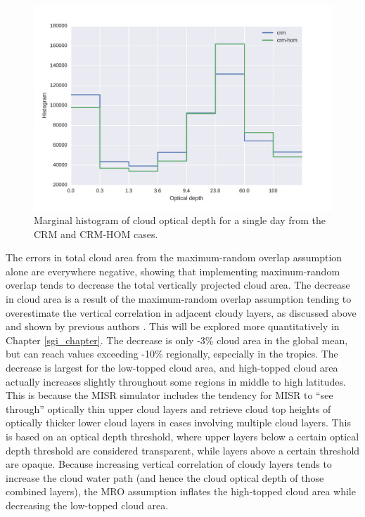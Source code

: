 \begin{figure}
\centering
\includegraphics[width=\columnwidth]{graphics/taudist_hom.pdf}
\caption{Marginal histogram of cloud optical depth for a single day from the CRM and CRM-HOM cases.}
\label{sg_cldtau_distribution}
\end{figure}

The errors in total cloud area from the maximum-random overlap assumption alone are everywhere negative, showing that implementing maximum-random overlap tends to decrease the total vertically projected cloud area. The decrease in cloud area is a result of the maximum-random overlap assumption tending to overestimate the vertical correlation in adjacent cloudy layers, as discussed above and shown by previous authors \citep{mace_and_benson-troth_2002, hogan_and_illingworth_2000, barker_2008}. This will be explored more quantitatively in Chapter \ref{sgi_chapter}. The decrease is only -3\% cloud area in the global mean, but can reach values exceeding -10\% regionally, especially in the tropics. The decrease is largest for the low-topped cloud area, and high-topped cloud area actually increases slightly throughout some regions in middle to high latitudes. This is because the MISR simulator includes the tendency for MISR to ``see through'' optically thin upper cloud layers and retrieve cloud top heights of optically thicker lower cloud layers in cases involving multiple cloud layers. This is based on an optical depth threshold, where upper layers below a certain optical depth threshold are considered transparent, while layers above a certain threshold are opaque. Because increasing vertical correlation of cloudy layers tends to increase the cloud water path (and hence the cloud optical depth of those combined layers), the MRO assumption inflates the high-topped cloud area while decreasing the low-topped cloud area.

